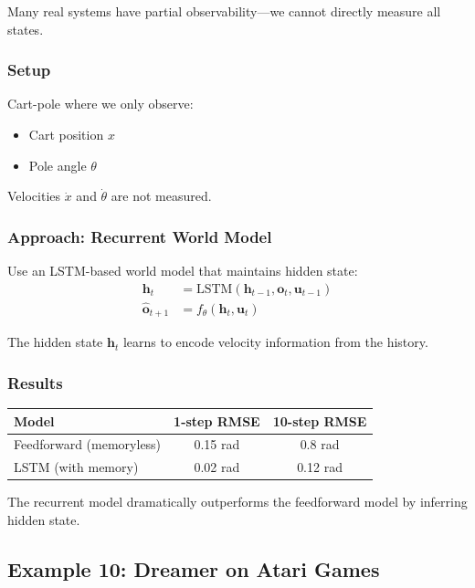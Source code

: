 Many real systems have partial observability---we cannot directly measure all states.

\subsubsection{Setup}

Cart-pole where we only observe:
\begin{itemize}
    \item Cart position $x$
    \item Pole angle $\theta$
\end{itemize}

Velocities $\dot{x}$ and $\dot{\theta}$ are not measured.

\subsubsection{Approach: Recurrent World Model}

Use an LSTM-based world model that maintains hidden state:
\begin{align}
\mathbf{h}_t &= \text{LSTM}(\mathbf{h}_{t-1}, \mathbf{o}_t, \mathbf{u}_{t-1}) \\
\hat{\mathbf{o}}_{t+1} &= f_\theta(\mathbf{h}_t, \mathbf{u}_t)
\end{align}

The hidden state $\mathbf{h}_t$ learns to encode velocity information from the history.

\subsubsection{Results}

\begin{center}
\begin{tabular}{lcc}
\toprule
\textbf{Model} & \textbf{1-step RMSE} & \textbf{10-step RMSE} \\
\midrule
Feedforward (memoryless) & 0.15 rad & 0.8 rad \\
LSTM (with memory) & 0.02 rad & 0.12 rad \\
\bottomrule
\end{tabular}
\end{center}

The recurrent model dramatically outperforms the feedforward model by inferring hidden state.

\subsection{Example 10: Dreamer on Atari Games}

